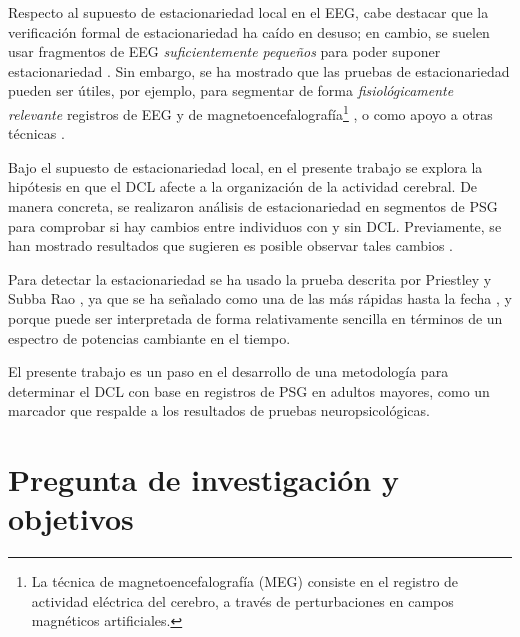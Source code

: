 \documentclass[12pt,letterpaper]{book}
\begin{document}
Respecto al supuesto de estacionariedad local en el EEG, cabe destacar que la verificación formal de estacionariedad ha caído en desuso; en cambio, se suelen usar fragmentos de EEG \textit{suficientemente pequeños} para poder suponer estacionariedad \cite{Kaiser00}.
%
Sin embargo, se  ha mostrado que las pruebas de estacionariedad pueden ser útiles, por ejemplo, para segmentar de forma \textit{fisiológicamente relevante} registros de EEG \cite{Kaplan99} y de magnetoencefalografía\footnote{La técnica de magnetoencefalografía (MEG) consiste en el registro de actividad eléctrica del cerebro, a través de perturbaciones en campos magnéticos artificiales.} \cite{lazyref1}, o como apoyo a otras técnicas \cite{allegrini10}.

Bajo el supuesto de estacionariedad local, en el presente trabajo se explora la hipótesis en que el DCL afecte a la organización de la actividad cerebral.
%
De manera concreta, se realizaron análisis de estacionariedad en segmentos de PSG para comprobar si hay cambios entre individuos con y sin DCL.
%
Previamente, se han mostrado resultados que sugieren es posible observar tales cambios
\cite{rosales2017stationarity}.

Para detectar la estacionariedad se ha usado la prueba descrita por Priestley y Subba Rao \cite{Priestley69}, ya que se ha señalado como una de las más rápidas hasta la fecha \cite{Nason13}, y porque puede ser interpretada de forma relativamente sencilla en términos de un espectro de potencias cambiante en el tiempo. 
%

El presente trabajo es un paso en el desarrollo de una metodología para determinar el DCL con base en registros de PSG en adultos mayores, como un marcador que respalde a los resultados de pruebas neuropsicológicas.
%


\section*{Pregunta de investigación y objetivos}
\end{document}
